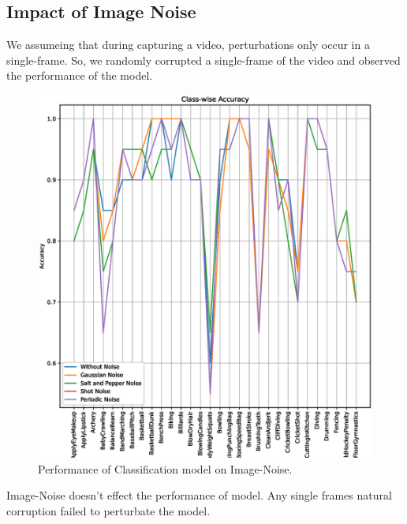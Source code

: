\documentclass[10pt,twocolumn,letterpaper]{article}
\begin{document}
\subsection{Impact of Image Noise}
We assumeing that during capturing a video, perturbations only occur in a single-frame. So, we randomly corrupted a single-frame of the video and observed the performance of the model.
\begin{figure}[!ht]
    \centering
    \includegraphics[width=\columnwidth]{./Images/Image_Noise.eps}
    \caption{Performance of Classification model on Image-Noise.}
\end{figure}
Image-Noise doesn't effect the performance of model. Any single frames natural corruption failed to perturbate the model.
\end{document}
